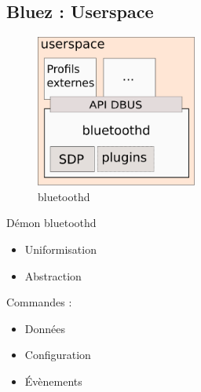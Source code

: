 \subsection{Bluez : Userspace}
\begin{frame}
\begin{minipage}[t]{0.60\linewidth}
	\begin{figure}
		\includegraphics[height=5cm]{bluetoothd.png}
		\caption{bluetoothd}
	\end{figure}
\end{minipage}
\begin{minipage}[t]{0.30\linewidth}
	\begin{block}{Démon bluetoothd}
		\begin{itemize}
			\item Uniformisation
			\item Abstraction
		\end{itemize}
		Commandes : 
		\begin{itemize}
			\item Données
			\item Configuration
			\item Évènements
		\end{itemize}
	\end{block}
\end{minipage}
\end{frame}

